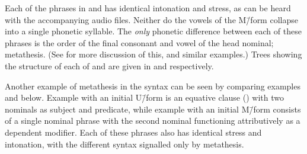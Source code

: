 Each of the phrases in  and 
has identical intonation and stress,
as can be heard with the accompanying audio files.
Neither do the vowels of the M\=/form collapse into a single phonetic syllable.
The \emph{only} phonetic difference between each of these phrases
is the order of the final consonant and vowel of the head nominal; metathesis.
(See  for more discussion of this, and similar examples.)
Trees showing the structure of each of  and 
are given in  and  respectively.

\begin{multicols}{2}
	\begin{exe}
		\label{tr:NenoMeseq}
		\label{tr:NeonMeseq}
	\end{exe}
\end{multicols}

Another example of metathesis in the syntax
can be seen by comparing examples  and  below.
Example  with an initial U\=/form is an equative clause
() with two nominals as subject and predicate,
while example  with an initial M\=/form consists of a single nominal phrase
with the second nominal functioning attributively as a dependent modifier.
Each of these phrases also has identical stress and intonation,
with the different syntax signalled only by metathesis.

\begin{multicols}{2}
	\begin{exe}
		\label{ex:BigSto1}
		\label{ex:BigSto2}
	\end{exe}
\end{multicols}

